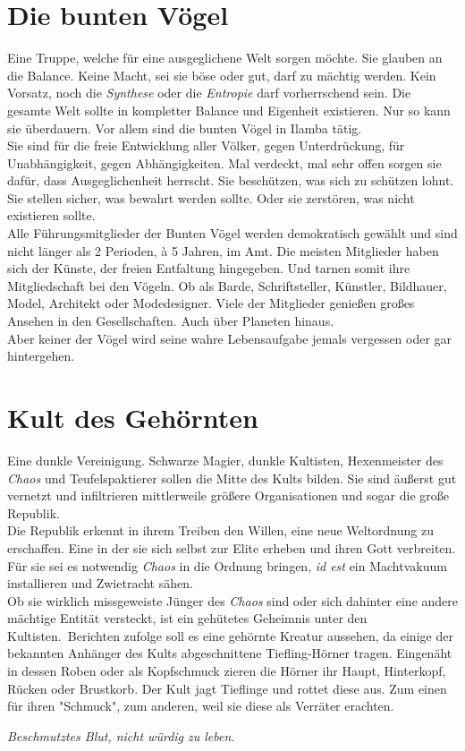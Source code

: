 \documentclass{book}
\begin{document}
\section{Die bunten Vögel}
Eine Truppe, welche für eine ausgeglichene Welt sorgen möchte. Sie glauben an die Balance. Keine Macht, sei sie böse oder gut, darf zu mächtig werden. Kein Vorsatz, noch die \emph{Synthese} oder die \emph{Entropie} darf vorherrschend sein. Die gesamte Welt sollte in kompletter Balance und Eigenheit existieren. Nur so kann sie überdauern. Vor allem sind die bunten Vögel in Ilamba tätig.\\
Sie sind für die freie Entwicklung aller Völker, gegen Unterdrückung, für Unabhängigkeit, gegen Abhängigkeiten. Mal verdeckt, mal sehr offen sorgen sie dafür, dass Ausgeglichenheit herrscht. Sie beschützen, was sich zu schützen lohnt. Sie stellen sicher, was bewahrt werden sollte. Oder sie zerstören, was nicht existieren sollte.\\
Alle Führungsmitglieder der Bunten Vögel werden demokratisch gewählt und sind nicht länger als 2 Perioden, à 5 Jahren, im Amt. Die meisten Mitglieder haben sich der Künste, der freien Entfaltung hingegeben. Und tarnen somit ihre Mitgliedschaft bei den Vögeln. Ob als Barde, Schriftsteller, Künstler, Bildhauer, Model, Architekt oder Modedesigner. Viele der Mitglieder genießen großes Ansehen in den Gesellschaften. Auch über Planeten hinaus.\\
Aber keiner der Vögel wird seine wahre Lebensaufgabe jemals vergessen oder gar hintergehen.\\

\section{Kult des Gehörnten}
Eine dunkle Vereinigung. Schwarze Magier, dunkle Kultisten, Hexenmeister des \emph{Chaos} und Teufelspaktierer sollen die Mitte des Kults bilden. Sie sind äußerst gut vernetzt und infiltrieren mittlerweile größere Organisationen und sogar die große Republik.\\
Die Republik erkennt in ihrem Treiben den Willen, eine neue Weltordnung zu erschaffen. Eine in der sie sich selbst zur Elite erheben und ihren Gott verbreiten. Für sie sei es notwendig \emph{Chaos} in die Ordnung bringen, {\it id est} ein Machtvakuum installieren und Zwietracht sähen.\\
Ob sie wirklich missgeweiste Jünger des \emph{Chaos} sind oder sich dahinter eine andere mächtige Entität versteckt, ist ein gehütetes Geheimnis unter den Kultisten. Berichten zufolge soll es eine gehörnte Kreatur aussehen, da einige der bekannten Anhänger des Kults abgeschnittene Tiefling-Hörner tragen. Eingenäht in dessen Roben oder als Kopfschmuck zieren die Hörner ihr Haupt, Hinterkopf, Rücken oder Brustkorb. Der Kult jagt Tieflinge und rottet diese aus. Zum einen für ihren "Schmuck", zum anderen, weil sie diese als Verräter erachten.
\begin{flushright}{\it Beschmutztes Blut, nicht würdig zu leben.}\end{flushright}
\end{document}
